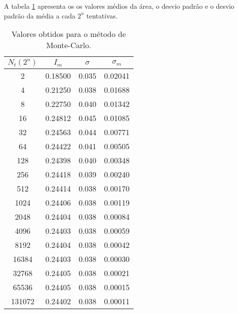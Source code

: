 \documentclass[a4paper,11pt, twoside]{article}
\newcommand{\n}[1]{\textbf{#1}}
\begin{document}
    A tabela \ref{monte} apresenta os os valores médios da área, o desvio padrão e o desvio padrão da média a cada $2^n$
    tentativas.
    {\linespread{1}
    \begin{table}[!th]
        \begin{center}
            \begin{tabular}{ c c c c }
                \toprule[0.11em]
                \n{$N_t (2^n)$} & \n{$I_m$} & \n{$\sigma$} & \n{$\sigma_m$}\\
                \toprule[0.11em]
                2 & 0.18500 & 0.035 & 0.02041\\
                \midrule
                4 & 0.21250 & 0.038 & 0.01688\\
                \midrule
                8 & 0.22750 & 0.040 & 0.01342\\
                \midrule
                16 & 0.24812 & 0.045 & 0.01085\\
                \midrule
                32 & 0.24563 & 0.044 & 0.00771\\
                \midrule
                64 & 0.24422 & 0.041 & 0.00505\\
                \midrule
                128 & 0.24398 & 0.040 & 0.00348\\
                \midrule
                256 & 0.24418 & 0.039 & 0.00240\\
                \midrule
                512 & 0.24414 & 0.038 & 0.00170\\
                \midrule
                1024 & 0.24406 & 0.038 & 0.00119\\
                \midrule
                2048 & 0.24404 & 0.038 & 0.00084\\
                \midrule
                4096 & 0.24403 & 0.038 & 0.00059\\
                \midrule
                8192 & 0.24404 & 0.038 & 0.00042\\
                \midrule
                16384 & 0.24403 & 0.038 & 0.00030\\
                \midrule
                32768 & 0.24405 & 0.038 & 0.00021\\
                \midrule
                65536 & 0.24405 & 0.038 & 0.00015\\
                \midrule
                131072 & 0.24402 & 0.038 & 0.00011\\
                \midrule
            \end{tabular}
        \end{center}
        \caption {Valores obtidos para o método de Monte-Carlo.}\label{monte}
    \end{table}}
\end{document}
